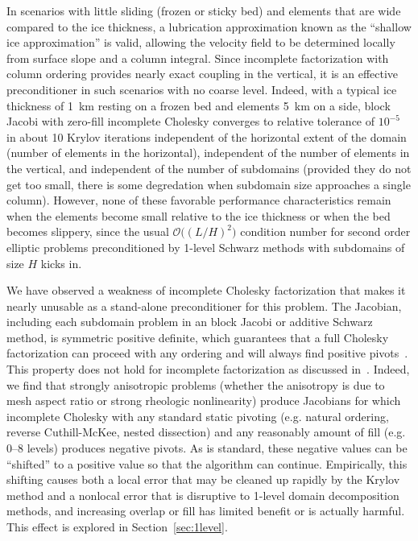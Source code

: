 \documentclass[3p]{elsarticle}
\newcommand{\bigO}{{\mathcal{O}}}
\begin{document}
In scenarios with little sliding (frozen or sticky bed) and elements that are wide compared to the
ice thickness, a lubrication approximation known as the ``shallow ice approximation'' is valid,
allowing the velocity field to be determined locally from surface slope and a column integral.
Since incomplete factorization with column ordering provides nearly exact coupling in the vertical,
it is an effective preconditioner in such scenarios with no coarse level.  Indeed, with a typical
ice thickness of \SI{1}{\kilo\metre} resting on a frozen bed and elements \SI{5}{\kilo\metre} on
a side, block Jacobi with zero-fill incomplete Cholesky converges to relative tolerance of $10^{-5}$
in about 10 Krylov iterations independent of the horizontal extent of the domain (number of elements
in the horizontal), independent of the number of elements in the vertical, and independent of the
number of subdomains (provided they do not get too small, there is some degredation when subdomain
size approaches a single column).  However, none of these favorable performance characteristics
remain when the elements become small relative to the ice thickness or when the bed becomes
slippery, since the usual $\bigO\big((L/H)^2\big)$ condition number for second order elliptic problems
preconditioned by 1-level Schwarz methods with subdomains of size $H$ kicks in.

We have observed a weakness of incomplete Cholesky factorization that makes it nearly unusable as a
stand-alone preconditioner for this problem.  The Jacobian, including each subdomain problem in an
block Jacobi or additive Schwarz method, is symmetric positive definite, which guarantees that a
full Cholesky factorization can proceed with any ordering and will always find positive
pivots~\cite{trefethen1997numerical}.  This property does not hold for incomplete factorization as
discussed in~\cite{kershaw1978incomplete}.  Indeed, we find that strongly anisotropic problems
(whether the anisotropy is due to mesh aspect ratio or strong rheologic nonlinearity) produce
Jacobians for which incomplete Cholesky with any standard static pivoting (e.g. natural ordering,
reverse Cuthill-McKee, nested dissection) and any reasonably amount of fill (e.g. 0--8 levels)
produces negative pivots.  As is standard, these negative values can be ``shifted'' to a positive
value so that the algorithm can continue.  Empirically, this shifting causes both a local error that
may be cleaned up rapidly by the Krylov method and a nonlocal error that is disruptive to 1-level
domain decomposition methods, and increasing overlap or fill has limited benefit or is actually
harmful.  This effect is explored in Section~\ref{sec:1level}.
\end{document}
